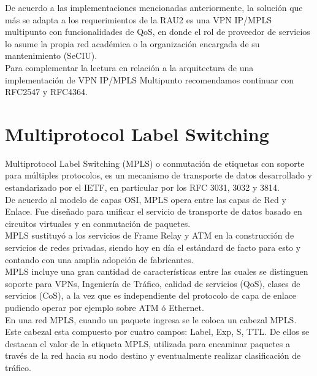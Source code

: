 De acuerdo a las implementaciones mencionadas anteriormente, la soluci\'on que m\'as se adapta a los requerimientos de la RAU2 es una VPN IP/MPLS multipunto con funcionalidades de QoS, en donde el rol de proveedor de servicios lo asume la propia red académica o la organizaci\'on encargada de su mantenimiento (SeCIU).\\ 

Para complementar la lectura en relaci\'on a la arquitectura de una implementaci\'on de VPN IP/MPLS Multipunto recomendamos continuar con RFC2547\citep{rosen1999bgp} y RFC4364\citep{rosen2006bgp}.

\section{Multiprotocol Label Switching}
\label{section2.8}

Multiprotocol Label Switching (MPLS) o conmutación de etiquetas con soporte para múltiples protocolos, es un mecanismo de transporte de datos desarrollado y estandarizado por el IETF, en particular por los RFC 3031\cite{rosen2001multiprotocol}, 3032\citep{rosen2001mpls} y 3814\citep{nadeau2004multiprotocol}.\\

De acuerdo al modelo de capas OSI, MPLS opera entre las capas de Red y Enlace. Fue diseñado para unificar el servicio de transporte de datos basado en circuitos virtuales y en conmutación de paquetes.\\

MPLS sustituy\'o a los servicios de Frame Relay y ATM en la construcci\'on de servicios de redes privadas, siendo hoy en d\'ia el est\'andard de facto para esto y contando con una amplia adopci\'on de fabricantes.\\

 
MPLS incluye una gran cantidad de características entre las cuales se distinguen soporte para VPNs, Ingeniería de Tráfico, calidad de servicios (QoS), clases de servicios (CoS), a la vez que es independiente del protocolo de capa de enlace pudiendo operar por ejemplo sobre ATM ó Ethernet.\\

En una red MPLS, cuando un paquete ingresa se le coloca un cabezal MPLS. Este cabezal esta compuesto por cuatro campos: Label, Exp, S, TTL. De ellos se destacan el valor de la etiqueta MPLS, utilizada para encaminar paquetes a través de la red hacia su nodo destino y eventualmente realizar clasificación de tr\'afico.

